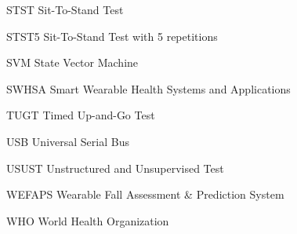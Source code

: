 {\begin{abbrv}
        \item[STST]             Sit-To-Stand Test
        \item[STST5]            Sit-To-Stand Test with 5 repetitions
        \item[SVM]              State Vector Machine
        \item[SWHSA]            Smart Wearable Health Systems and Applications
        \item[TUGT]             Timed Up-and-Go Test
        \item[USB]              Universal Serial Bus
        \item[USUST]            Unstructured and Unsupervised Test
        \item[WEFAPS]           Wearable Fall Assessment \& Prediction System
        \item[WHO]              World Health Organization
    \end{abbrv}
    
}